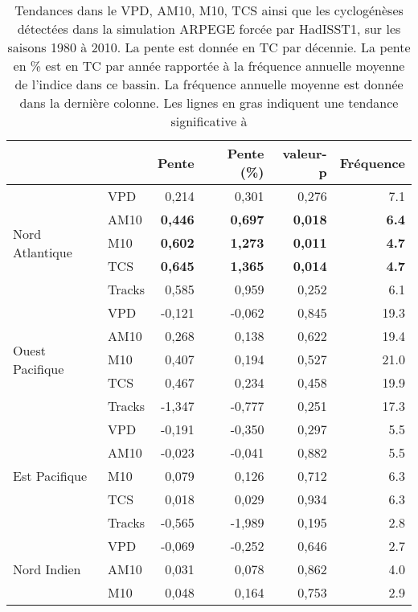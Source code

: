\documentclass[../main.tex]{subfiles}
\begin{document}
\begin{table}[htpb]
    \centering
    \caption{Tendances dans le VPD, AM10, M10, TCS ainsi que les cyclogénèses détectées dans la simulation ARPEGE forcée par HadISST1, sur les saisons 1980 à
    2010. La pente est donnée en TC par décennie. La pente en \% est en TC par année rapportée à la fréquence annuelle moyenne de l'indice dans ce bassin.
    La fréquence annuelle moyenne est donnée dans la dernière colonne. Les lignes en gras indiquent une tendance significative à
    }
    \label{tab:tendances_PRE625REFT359x}
    \begin{adjustbox}{height=0.425\textheight}
    \begin{tabular}{llrrrr}
    \toprule
     &  & Pente & Pente (\%) & valeur-p & Fréquence \\
    \midrule
    \multirow[t]{5}{*}{Nord Atlantique} & VPD & 0,214 & 0,301 & 0,276 & 7.1 \\
     & AM10 & \textbf{0,446} & \textbf{0,697} & \textbf{0,018} & \textbf{6.4} \\
     & M10 & \textbf{0,602} & \textbf{1,273} & \textbf{0,011} & \textbf{4.7} \\
     & TCS & \textbf{0,645} & \textbf{1,365} & \textbf{0,014} & \textbf{4.7} \\
     & Tracks & 0,585 & 0,959 & 0,252 & 6.1 \\
    \midrule
    \multirow[t]{5}{*}{Ouest Pacifique} & VPD & -0,121 & -0,062 & 0,845 & 19.3 \\
     & AM10 & 0,268 & 0,138 & 0,622 & 19.4 \\
     & M10 & 0,407 & 0,194 & 0,527 & 21.0 \\
     & TCS & 0,467 & 0,234 & 0,458 & 19.9 \\
     & Tracks & -1,347 & -0,777 & 0,251 & 17.3 \\
    \midrule
    \multirow[t]{5}{*}{Est Pacifique} & VPD & -0,191 & -0,350 & 0,297 & 5.5 \\
     & AM10 & -0,023 & -0,041 & 0,882 & 5.5 \\
     & M10 & 0,079 & 0,126 & 0,712 & 6.3 \\
     & TCS & 0,018 & 0,029 & 0,934 & 6.3 \\
     & Tracks & -0,565 & -1,989 & 0,195 & 2.8 \\
    \midrule
    \multirow[t]{5}{*}{Nord Indien} & VPD & -0,069 & -0,252 & 0,646 & 2.7 \\
     & AM10 & 0,031 & 0,078 & 0,862 & 4.0 \\
     & M10 & 0,048 & 0,164 & 0,753 & 2.9 \\

\end{tabular}
\end{adjustbox}
\end{table}
\end{document}
